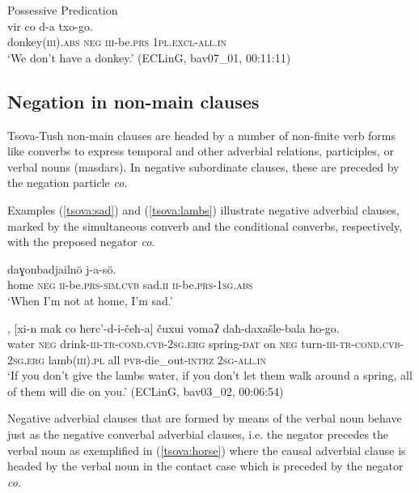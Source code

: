 \documentclass[output=paper,%
colorlinks,citecolor=brown,
showindex
]{langscibook}
\begin{document}
\ea	\label{tsova:donkey}
Possessive Predication\\
\gll 	vir	co	d-a	txo-go.\\  
	donkey(\textsc{iii}).\textsc{abs} \textsc{neg} \textsc{iii}-be.\textsc{prs} \textsc{1pl.excl-all.in}\\
\glt `We don't have a donkey.' (ECLinG, bav07\_01, 00:11:11)
\z

\subsection{Negation in non-main clauses}
\label{tsova:nonmain}

Tsova-Tush non-main clauses are headed by a number of non-finite verb forms like converbs to express temporal and other adverbial relations, participles, or verbal nouns (masdars). In negative subordinate clauses, these are preceded by the negation particle \textit{co}. 

Examples (\ref{tsova:sad}) and (\ref{tsova:lambs}) illustrate negative adverbial clauses, marked by the simultaneous converb and the conditional converbs, respectively, with the preposed negator \textit{co}.

\ea	\label{tsova:sad}
\gll 	[čuħ	co	j-a-š]	daɣonbadjailnŏ	j-a-sŏ.\\ 
	home \textsc{neg} \textsc{ii}-be.\textsc{prs}-\textsc{sim.cvb} sad.\textsc{ii} \textsc{ii}-be.\textsc{prs}-\textsc{1sg.abs}\\
\glt `When I'm not at home, I'm sad.' \citep[203]{HoliskyGagua1994} 
\z

\ea	\label{tsova:lambs}
, [xi-n mak co ħerc'-d-i-čeħ-a] čuxui vomaʔ daħ-daxašle-bala ħo-go.\\  
	water \textsc{neg} drink-\textsc{iii-tr}-\textsc{cond.cvb}-\textsc{2sg.erg} spring-\textsc{dat} on \textsc{neg} turn-\textsc{iii-tr}-\textsc{cond.cvb}-\textsc{2sg.erg} lamb\textsc{(iii).pl} all \textsc{pvb}-die\_out-\textsc{intrz} \textsc{2sg-all.in}\\
\glt `If you don't give the lambs water, if you don't let them walk around a spring, all of them will die on you.' (ECLinG, bav03\_02, 00:06:54)
\z

Negative adverbial clauses that are formed by means of the verbal noun behave just as the negative converbal adverbial clauses, i.e. the negator precedes the verbal noun as exemplified in (\ref{tsova:horse}) where the causal adverbial clause is headed by the verbal noun in the contact case which is preceded by the negator \textit{co}.
\end{document}
